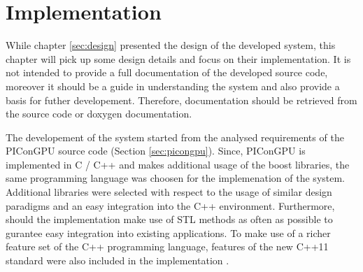 \chapter{Implementation}
\label{sec:implementation}



While chapter \ref{sec:design} presented the design of the developed
system, this chapter will pick up some design details and focus on
their implementation.  It is not intended to provide a full
documentation of the developed source code, moreover it should be a
guide in understanding the system and also provide a basis for futher
developement. Therefore, documentation should be retrieved from the
source code or doxygen \cite{ref:doxygen} documentation.

The developement of the system started from the analysed requirements
of the PIConGPU source code (Section \ref{sec:picongpu}). Since,
PIConGPU is implemented in C / C++ and makes additional usage of the
boost \cite{ref:boost} libraries, the same programming language was
choosen for the implemenation of the system. Additional libraries were
selected with respect to the usage of similar design paradigms and an
easy integration into the C++ environment. Furthermore, should the
implementation make use of STL methods as often as possible to
gurantee easy integration into existing applications.  To make use of
a richer feature set of the C++ programming language, features of the
new C++11 standard were also included in the implementation
\cite{ref:c++11}.

